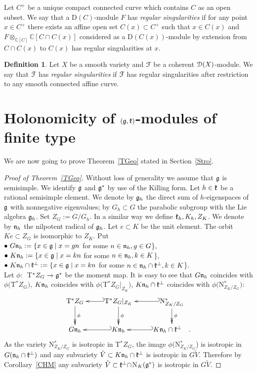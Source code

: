 \documentclass[12pt]{amsart}
\theoremstyle{definition}\newtheorem{theorem}{Theorem}[section]
\theoremstyle{definition}\newtheorem{definition}[proposition]{Definition}
\theoremstyle{remark}\newtheorem{example}[proposition]{Example}
\renewcommand{\to}[1][]{\xrightarrow{#1}}
\begin{document}
Let $C^+$ be a unique  compact connected curve which contains $C$ as an open subset. We say that a D$(C)$-module $F$ has {\it regular singularities} if for any point $x\in C^+$ there exists an affine open set $C(x)\subset C^+$ such that $x\in C(x)$ and $F\otimes_{\mathbb C[C]}\mathbb C[C\cap C(x)]$ considered as a D$(C(x))$-module by extension from $C\cap C(x)$ to $C(x)$ has regular singularities at $x$.
\begin{definition}Let $X$ be a smooth variety and $\EuScript F$ be a coherent $\EuScript D(X)$-module. We say that $\EuScript F$ has {\it regular singularities} if $\EuScript F$ has regular singularities after restriction to any smooth connected affine curve.\end{definition}
\newpage\section{Holonomicity of $(\frak g, \frak k)$-modules of finite type}\label{SHol}
We are now going to prove Theorem~\ref{TGeo} stated in Section~\ref{Stro}.
\begin{proof}[ Proof of Theorem~\ref{TGeo}] Without loss of generality we assume that $\frak g$ is semisimple. We identify $\frak g$ and $\frak g^*$ by use of the Killing form. Let $h\in\frak k$ be a rational semisimple element. We denote by $\frak g_h$ the direct sum of $h$-eigenspaces of $\frak g$ with nonnegative eigenvalues; by $G_h\subset G$ the parabolic subgroup with the Lie algebra $\frak g_h$. Set $Z_G:=G/G_h$. In a similar way we define $\frak k_h, K_h, Z_K$. We denote by $\frak n_h$ the nilpotent radical of $\frak g_h$. Let $e\subset K$ be the unit element. The orbit $Ke\subset Z_G$ is isomorphic to $Z_K$. Put\\$\bullet~G\frak n_h:=\{x\in\frak g\mid x=gn$ for some $n\in\frak n_h, g\in G$\},\\$\bullet~K\frak n_h:=\{x\in\frak g\mid x=kn$ for some $n\in\frak n_h, k\in K$\},\\$\bullet~K\frak n_h\cap\frak k^\bot:=\{x\in\frak g\mid x=kn$ for some $n\in\frak n_h\cap\frak k^\bot, k\in K$\}.\\
Let $\phi:$~T$^*Z_G\to\frak g^*$ be the moment map. It is easy to see that $G\frak n_h$ coincides with $\phi($T$^*Z_G)$, $K\frak n_h$ coincides with $\phi($T$^*Z_G|_{Z_K})$, $K\frak n_h\cap\frak k^\bot$ coincides with $\phi($N$_{Z_K/Z_G}^*)$:
$$\xymatrix{\mathrm T^*Z_G\ar@{->>}[d]^\phi\ar@{<-^)}[r]&\mathrm T^*Z_G|_{Z_K}\ar@{->>}[d]^\phi\ar@{<-^)}[r]&\mathrm N^*_{Z_K/Z_G}\ar@{->>}[d]^\phi\\G\frak n_h\ar@{<-^)}[r]&K\frak n_h\ar@{<-^)}[r]&K\frak n_h\cap\frak k^\bot\hspace{10pt}.}$$
As the variety N$^*_{Z_K/Z_G}$ is isotropic in T$^*Z_G$, the image $\phi($N$^*_{Z_K/Z_G}$) is isotropic in $G(\frak n_h\cap\frak k^\bot)$ and any subvariety $\tilde V\subset K\frak n_h\cap\frak k^\bot$ is isotropic in $G\tilde V$. Therefore by Corollary~\ref{CHM} any subvariety $\tilde V\subset\frak k^\bot\cap$N$_K(\frak g^*)$ is isotropic in $G\tilde V$.\end{proof}
\end{document}
